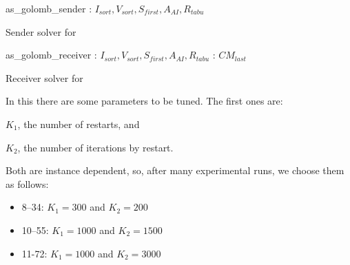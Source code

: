 \begin{algorithm}
\dontprintsemicolon
\SetNoline
{}
   as\_golomb\_sender\;
\algoindent {} : $I_{sort}, V_{sort}, S_{first}, A_{AI}, R_{tabu}$ \;
\caption{Sender solver for \GRP}\label{as:golomb_sender}
\end{algorithm}

\begin{algorithm}
\dontprintsemicolon
\SetNoline
{}
   as\_golomb\_receiver\;
\algoindent {} : $I_{sort}, V_{sort}, S_{first}, A_{AI}, R_{tabu}$ \;
\algoindent {}: $CM_{last}$\;
\caption{Receiver solver for \GRP}\label{as:golomb_receiver}
\end{algorithm}

In this \commstr{} there are some parameters to be tuned. The first ones are: \begin{inparaenum}[1)] \item $K_1$, the number of restarts, and \item $K_2$, the number of iterations by restart. \end{inparaenum} Both are instance dependent, so, after many experimental runs, we choose them as follows:
\begin{itemize}
\item \gr{} 8--34: $K_1 = 300$ and $K_2 = 200$
\item \gr{} 10--55: $K_1 = 1000$ and $K_2 = 1500$
\item \gr{} 11-72: $K_1 = 1000$ and $K_2 = 3000$
\end{itemize}

